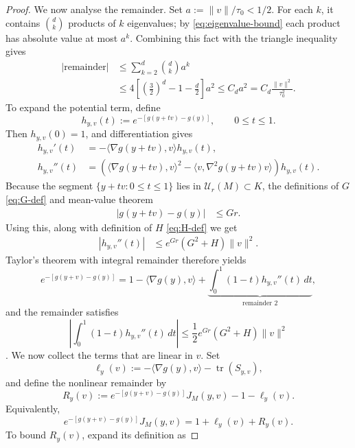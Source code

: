 \documentclass{article}
\numberwithin{equation}{section}
\newcommand{\Ucal}{\mathcal{U}}
\begin{document}
\begin{proof}
We now analyse the remainder. Set
$a:=\lVert v\rVert/\tau_0<1/2$. For each $k$, it contains
$\binom{d}{k}$ products of $k$ eigenvalues; by
\eqref{eq:eigenvalue-bound} each product has absolute value at most $a^k$.
Combining this fact with the triangle inequality gives
\begin{align*}
 \bigg|\text{remainder}\bigg|
 &\le \sum_{k=2}^d\binom{d}{k}a^k\\
 &\le4\left[\left(\frac32\right)^d-1-\frac d2\right]a^2
 \le C_da^2
 =C_d\frac{\lVert v\rVert^2}{\tau_0^2}.
\end{align*}
To expand the potential term, define
\[
 h_{y,v}(t):=e^{-[g(y+tv)-g(y)]},
 \qquad 0\le t\le1.
\]
Then $h_{y,v}(0)=1$, and differentiation gives
\begin{align*}
 h_{y,v}'(t)
 &=-\langle\nabla g(y+tv),v\rangle h_{y,v}(t),\\
 h_{y,v}''(t)
 &=\left(
    \langle\nabla g(y+tv),v\rangle^2
    -\langle v,\nabla^2g(y+tv)v\rangle
   \right)h_{y,v}(t).
\end{align*}
Because the segment $\{y+tv:0\le t\le1\}$ lies in $\Ucal_r(M)\subset K$, the definitions of $G$ \eqref{eq:G-def} and mean-value theorem
\begin{align*}
 |g(y+tv)-g(y)|&\le Gr.
\end{align*}
Using this, along with definition of $H$ \eqref{eq:H-def} we get
\begin{align*}
 |h_{y,v}''(t)|
 &\le e^{Gr}(G^2+H)\lVert v\rVert^2.
\end{align*}
Taylor's theorem with integral remainder therefore yields
\begin{equation}
 e^{-[g(y+v)-g(y)]}
 =1-\langle\nabla g(y),v\rangle
 +\underbrace{\int_0^1(1-t)h_{y,v}''(t)\,dt}_{\text{remainder 2}},
\label{eq:potential-expansion}
\end{equation}
and the remainder satisfies
\[
 \left|\int_0^1(1-t)h_{y,v}''(t)\,dt\right|
 \le \frac12e^{Gr}(G^2+H)\lVert v\rVert^2
\].
We now collect the terms that are linear in $v$.  Set
\[
 \ell_y(v)
 :=-\langle\nabla g(y),v\rangle
   -\operatorname{tr}(S_{y,v}),
\]
and define the nonlinear remainder by
\begin{equation}
 R_y(v)
 :=e^{-[g(y+v)-g(y)]}J_M(y,v)-1-\ell_y(v).
\label{eq:Ry-def}
\end{equation}
Equivalently,
\begin{equation}
 e^{-[g(y+v)-g(y)]}J_M(y,v)
 =1+\ell_y(v)+R_y(v).
\label{eq:fiber-expansion}
\end{equation}
To bound $R_y(v)$, expand its definition as

\end{proof}
\end{document}
